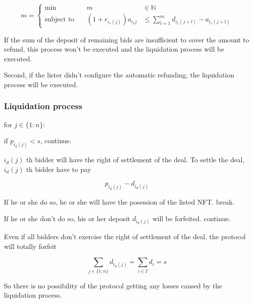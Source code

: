 \documentclass[dvipdfmx]{jsarticle}
\begin{document}
$$
  m = \left\{\begin{aligned}
    \min && \ m & \in \mathbb{N} \\
    \text{subject to} && \ (1 + r_{i_r(j)}) a_{i_r{j}} & \le \sum_{l=1}^m {d_{i_r(j+l)} - a_{i_r(j+l)}}
  \end{aligned}\right.
$$

If the sum of the deposit of remaining bids are insufficient to cover the amount to refund, this process won't be executed and the liquidation process will be executed.

Second, if the lister didn't configure the automatic refunding, the liquidation process will be executed.

\subsubsection{Liquidation process}

for $j \in \{1:n\}$:

if $p_{i_d(j)} < s$, continue.

$i_d(j)$ th bidder will have the right of settlement of the deal.
To settle the deal, $i_d(j)$ th bidder have to pay

$$
  p_{i_d(j)} - d_{i_d(j)}
$$

If he or she do so, he or she will have the posession of the listed NFT. break.

If he or she don't do so, his or her deposit $d_{i_d(j)}$ will be forfeited. continue.

Even if all bidders don't exercise the right of settlement of the deal,
the protocol will totally forfeit 

$$
  \sum_{j \in \{1:n\}} d_{i_d(j)} = \sum_{i \in I} d_i = s
$$

So there is no possibility of the protocol getting any losses caused by the liquidation process.
\end{document}
